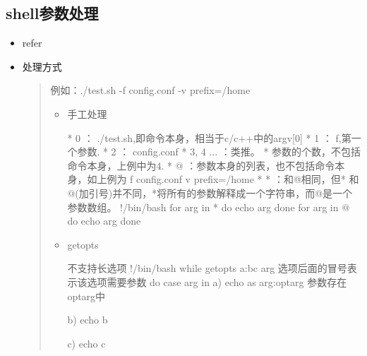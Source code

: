 \documentclass[a4paper,10pt,english]{sphinxmanual}
\begin{document}
\subsection{shell参数处理}
\label{\detokenize{linux/shell:id2}}\begin{itemize}
\item {} 
refer
\begin{quote}

\end{quote}

\item {} 
处理方式
\begin{quote}

例如：./test.sh -f config.conf -v \textendash{}prefix=/home
\begin{itemize}
\item {} 
手工处理

\begin{sphinxVerbatim}[commandchars=\\\{\}]
* \PYGZdl{}0 ： ./test.sh,即命令本身，相当于c/c++中的argv[0]
* \PYGZdl{}1 ： \PYGZhy{}f,第一个参数.
* \PYGZdl{}2 ： config.conf
* \PYGZdl{}3, \PYGZdl{}4 ... ：类推。
* \PYGZdl{}\PYGZsh{}  参数的个数，不包括命令本身，上例中\PYGZdl{}\PYGZsh{}为4.
* \PYGZdl{}@ ：参数本身的列表，也不包括命令本身，如上例为 \PYGZhy{}f config.conf \PYGZhy{}v \PYGZhy{}\PYGZhy{}prefix=/home
* \PYGZdl{}* ：和\PYGZdl{}@相同，但\PYGZdq{}\PYGZdl{}*\PYGZdq{} 和 \PYGZdq{}\PYGZdl{}@\PYGZdq{}(加引号)并不同，\PYGZdq{}\PYGZdl{}*\PYGZdq{}将所有的参数解释成一个字符串，而\PYGZdq{}\PYGZdl{}@\PYGZdq{}是一个参数数组。
\PYGZsh{}!/bin/bash
for arg in \PYGZdq{}\PYGZdl{}*\PYGZdq{}
do
  echo \PYGZdl{}arg
done
for arg in \PYGZdq{}\PYGZdl{}@\PYGZdq{}
do
 echo \PYGZdl{}arg
done
\end{sphinxVerbatim}

\item {} 
getopts

\begin{sphinxVerbatim}[commandchars=\\\{\}]
不支持长选项
\PYGZsh{}!/bin/bash
while getopts \PYGZdq{}a:bc\PYGZdq{} arg \PYGZsh{}选项后面的冒号表示该选项需要参数
do
        case \PYGZdl{}arg in
             a)
                echo \PYGZdq{}a\PYGZsq{}s arg:\PYGZdl{}optarg\PYGZdq{} \PYGZsh{}参数存在\PYGZdl{}optarg中

             b)
                echo \PYGZdq{}b\PYGZdq{}

             c)
                echo \PYGZdq{}c\PYGZdq{}


\end{sphinxVerbatim}
\end{itemize}
\end{quote}
\end{itemize}
\end{document}
